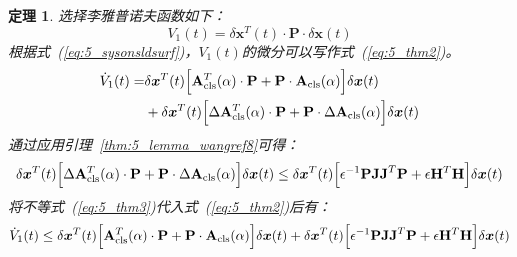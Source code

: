 \documentclass{article}
\newtheorem{theorem}{定理}
\begin{document}
\begin{theorem}
选择李雅普诺夫函数如下：
\begin{equation}
V_1(t)=\delta \bm{x}^{T}(t)\cdot \mathbf{P}\cdot \delta \bm{x}(t)
\label{eq:5_thm1}
\end{equation}
根据式~(\ref{eq:5_sysonsldsurf})，$V_1(t)$的微分可以写作式~(\ref{eq:5_thm2})。
\begin{equation}
\begin{aligned}
\dot V_1(t) =&\delta \bm{x}^{T}(t)\Big [\mathbf{A}_{\rm{cls}}^{T}(\alpha)\cdot \mathbf{P}+\mathbf{P}\cdot \mathbf{A}_{\rm{cls}}(\alpha)\Big ]\delta \bm{x}(t) \\
&+\delta \bm{x}^{T}(t)\Big [\Delta \mathbf{A}_{\rm{cls}}^{T}(\alpha)\cdot \mathbf{P}+\mathbf{P}\cdot \Delta \mathbf{A}_{\rm{cls}}(\alpha)\Big ]\delta \bm{x}(t)
\label{eq:5_thm2}
\end{aligned}
\end{equation}
通过应用引理~\ref{thm:5_lemma_wangref8}可得：
\begin{equation}
\begin{aligned}
\delta \bm{x}^{T}(t)\Big[\Delta \mathbf{A}_{\rm{cls}}^{T}(\alpha)\cdot \mathbf{P}+\mathbf{P} \cdot \Delta \mathbf{A}_{\rm{cls}}(\alpha)\Big ]\delta \bm{x}(t) \leq \delta \bm{x}^{T}(t)\Big [\epsilon^{-1} \mathbf{PJJ}^{T}\mathbf{P}+\epsilon \mathbf{H}^{T}\mathbf{H}\Big ]\delta \bm{x}(t)
\label{eq:5_thm3}
\end{aligned}
\end{equation}
将不等式~(\ref{eq:5_thm3})代入式~(\ref{eq:5_thm2})后有：
\begin{equation}
\begin{aligned}
\dot V_1(t) \leq  \delta \bm{x}^{T}(t)\Big [\mathbf{A}_{\rm{cls}}^{T}(\alpha)\cdot \mathbf{P}+\mathbf{P}\cdot \mathbf{A}_{\rm{cls}}(\alpha)\Big ]\delta \bm{x}(t)
+\delta \bm{x}^{T}(t)\Big [\epsilon^{-1} \mathbf{PJJ}^{T}\mathbf{P}+\epsilon \mathbf{H}^{T}\mathbf{H}\Big ]\delta \bm{x}(t)
\label{eq:5_thm4}
\end{aligned}
\end{equation}


\end{theorem}
\end{document}
